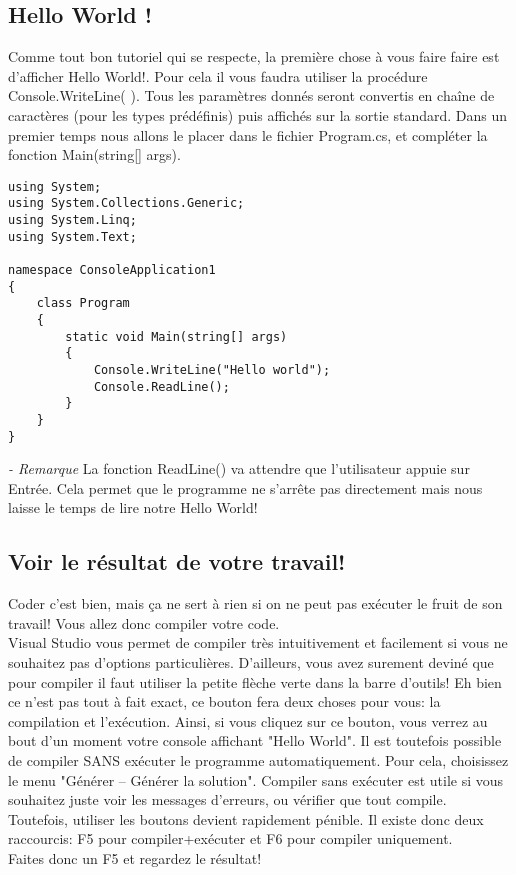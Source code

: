 \documentclass[12pt,a4paper]{report}
\begin{document}
\subsection{Hello World !}
Comme tout bon tutoriel qui se respecte, la première chose à vous faire
faire est d’afficher Hello World!. Pour cela il vous faudra utiliser la procédure
Console.WriteLine( ). Tous les paramètres donnés seront
convertis en chaîne de caractères (pour les types prédéfinis) puis
affichés sur la sortie standard.
Dans un premier temps nous allons le placer dans le fichier Program.cs, et compléter la fonction Main(string[] args).
\begin{lstlisting}
using System;
using System.Collections.Generic;
using System.Linq;
using System.Text;

namespace ConsoleApplication1
{
    class Program
    {
        static void Main(string[] args)
        {
            Console.WriteLine("Hello world");
            Console.ReadLine();
        }
    }
}

\end{lstlisting}
\emph{- Remarque }La fonction ReadLine() va attendre que l'utilisateur appuie sur
Entrée. Cela permet que le programme ne s'arrête pas directement mais nous
laisse le temps de lire notre Hello World!
\subsection{Voir le résultat de votre travail!}
Coder c'est bien, mais ça ne sert à rien si on ne peut pas exécuter le fruit de son travail! Vous allez donc compiler votre code.\\
Visual Studio vous permet de compiler très intuitivement et facilement si vous ne souhaitez pas d'options particulières. D'ailleurs, vous avez surement deviné que pour compiler il faut utiliser la petite flèche verte dans la barre d'outils! Eh bien ce n'est pas tout à fait exact, ce bouton fera deux choses pour vous: la compilation et l'exécution.
Ainsi, si vous cliquez sur ce bouton, vous verrez au bout d'un moment votre console affichant "Hello World". Il est toutefois possible de compiler SANS exécuter le programme automatiquement.
Pour cela, choisissez le menu "Générer -- Générer la solution". Compiler sans exécuter est utile si vous souhaitez juste voir les messages d'erreurs, ou vérifier que tout compile.\\
Toutefois, utiliser les boutons devient rapidement pénible. Il existe donc deux raccourcis: F5 pour compiler+exécuter et F6 pour compiler uniquement.\\
Faites donc un F5 et regardez le résultat!
\end{document}
